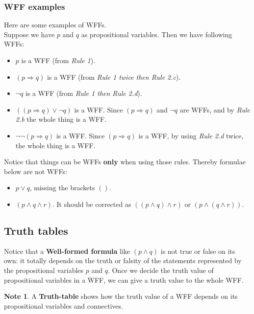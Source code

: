 \documentclass[11pt]{article}
\theoremstyle{definition}
\newtheorem{note}{Note}[subsection]
\begin{document}
\subsubsection{WFF examples}
Here are some examples of WFFs.\\
Suppose we have $p$ and $q$ as propositional variables. Then we have following WFFs:
\begin{itemize}
    \item $p$ is a WFF (from \textit{Rule 1}).
    \item $(p \Rightarrow q)$ is a WFF (from \textit{Rule 1 twice then Rule 2.c}).
    \item $\neg q$ is a WFF (from \textit{Rule 1 then Rule 2.d}).
    \item $((p \Rightarrow q) \vee \neg q)$ is a WFF. Since $(p \Rightarrow q)$ and $\neg q$ are WFFs, and by \textit{Rule 2.b} the whole thing is a WFF.
    \item $\neg \neg (p \Rightarrow q)$ is a WFF. Since $(p \Rightarrow q)$ is a WFF, by using \textit{Rule 2.d} twice, the whole thing is a WFF.
\end{itemize}

Notice that things can be WFFs \textbf{only} when using those rules. Thereby formulae below are not WFFs:
\begin{itemize}
    \item $p \vee q$, missing the brackets $()$.
    \item $(p \wedge q \wedge r)$. It should be corrected as $((p \wedge q) \wedge r)$ or $(p \wedge (q \wedge r))$.
\end{itemize}

\subsection{Truth tables}
Notice that a \textbf{Well-formed formula} like $(p \wedge q)$ is not true or false on its own: it totally depends on the truth or falsity of the statements represented by the propositional variables $p$ and $q$. Once we decide the truth value of propositional variables in a WFF, we can give a truth value to the whole WFF.

\begin{note}
    A \textbf{Truth-table} shows how the truth value of a WFF depends on its propositional variables and connectives.
\end{note}
\end{document}
